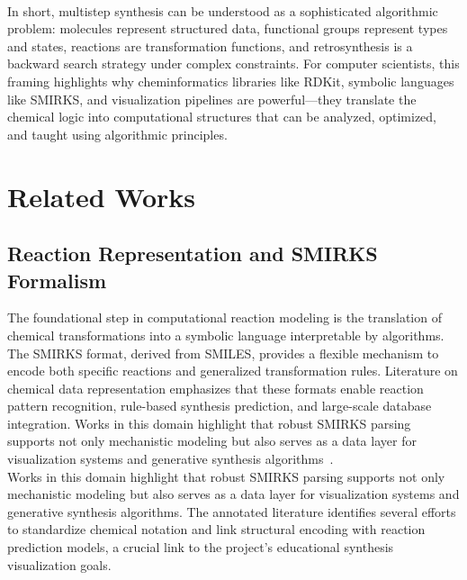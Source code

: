 \documentclass[12pt]{article}
\begin{document}
\\
\indent
In short, multistep synthesis can be understood as a sophisticated algorithmic problem: molecules represent structured data, functional groups represent types and states, reactions are transformation functions, and retrosynthesis is a backward search strategy under complex constraints.
For computer scientists, this framing highlights why cheminformatics libraries like RDKit, symbolic languages like SMIRKS, and visualization pipelines are powerful—they translate the chemical logic into computational structures that can be analyzed, optimized, and taught using algorithmic principles.
\\

    
\section{Related Works}
\subsection{Reaction Representation and SMIRKS Formalism}
\indent
The foundational step in computational reaction modeling is the translation of chemical transformations into a symbolic language interpretable by algorithms.
The SMIRKS format, derived from SMILES, provides a flexible mechanism to encode both specific reactions and generalized transformation rules.
Literature on chemical data representation emphasizes that these formats enable reaction pattern recognition, rule-based synthesis prediction, and large-scale database integration.
Works in this domain highlight that robust SMIRKS parsing supports not only mechanistic modeling but also serves as a data layer for visualization systems and generative synthesis algorithms~\cite{10.1002/ail2.91}.
\\
\indent
Works in this domain highlight that robust SMIRKS parsing supports not only mechanistic modeling but also serves as a data layer for visualization systems and generative synthesis algorithms.
The annotated literature identifies several efforts to standardize chemical notation and link structural encoding with reaction prediction models, a crucial link to the project’s educational synthesis visualization goals.
\end{document}
